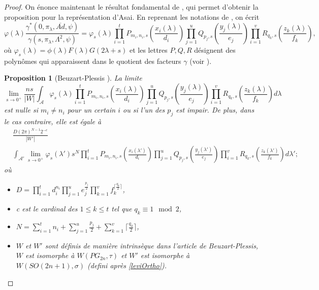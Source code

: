 \documentclass{amsart}
\newtheorem{proposition}{Proposition}[section]
\begin{document}
\begin{proof}
On énonce maintenant le résultat fondamental de \cite{beuzart-plessis}, qui permet d'obtenir la proposition pour la représentation d'Asai. En reprenant les notations de \cite{beuzart-plessis}, on écrit
\begin{equation}
\varphi(\lambda) \frac{\gamma^*(0, \pi_\lambda, \overline{Ad}, \psi)}{\gamma(s, \pi_\lambda, \Lambda^2, \psi)} = \varphi_s(\lambda) 
\prod_{i=1}^t P_{m_i,n_i,s}(\frac{x_i(\lambda)}{d_i}) \prod_{j=1}^u Q_{p_j,s}(\frac{y_j(\lambda)}{e_j}) \prod_{i=1}^v R_{q_k,s}(\frac{z_k(\lambda)}{f_k}),
\end{equation}
où $\varphi_s(\lambda) = \phi(\lambda) F(\lambda) G(2\lambda+s)$ et les lettres $P, Q, R$ désignent des polynômes qui apparaissent dans le quotient des facteurs $\gamma$ (voir \cite[section 3]{beuzart-plessis}).
\begin{proposition}[Beuzart-Plessis \cite{beuzart-plessis}]
\label{beuzart-plessis}
La limite
\begin{equation}
\lim_{s \rightarrow 0^+}  \frac{n s}{|W|} \int_{\mathcal{A}} \varphi_s(\lambda) 
\prod_{i=1}^t P_{m_i,n_i,s}(\frac{x_i(\lambda)}{d_i}) \prod_{j=1}^u Q_{p_j,s}(\frac{y_j(\lambda)}{e_j}) \prod_{i=1}^v R_{q_k,s}(\frac{z_k(\lambda)}{f_k}) d\lambda
\end{equation}
est nulle si $m_i \neq n_i$ pour un certain $i$ ou si l'un des $p_j$ est impair. De plus, dans le cas contraire, elle est égale à
\begin{equation}
\begin{split}
&\frac{D(2\pi)^{N-1}2^{-c}}{|W'|} \\
&\int_{\mathcal{A}'} \lim_{s \rightarrow 0^+} \varphi_s(\lambda') s^N \prod_{i=1}^t P_{m_i,n_i,s}(\frac{x_i(\lambda')}{d_i}) \prod_{j=1}^u Q_{p_j,s}(\frac{y_j(\lambda')}{e_j}) \prod_{i=1}^v R_{q_k,s}(\frac{z_k(\lambda')}{f_k}) d\lambda';
\end{split}
\end{equation}
où
\begin{itemize}
\item $D = \prod_{i=1}^t d_i^{n_i} \prod_{j=1}^u e_j^{\frac{p_j}{2}} \prod_{k=1}^v f_k^{\lceil \frac{q_k}{2} \rceil}$,
\item c est le cardinal des $1 \leq k \leq t$ tel que $q_k \equiv 1 \mod 2$,
\item $N = \sum_{i=1}^t n_i + \sum_{j=1}^u \frac{p_j}{2} + \sum_{k=1}^v \lceil \frac{q_k}{2} \rceil$,
\item $W$ et $W'$ sont définis de manière intrinsèque dans l'article de Beuzart-Plessis, $W$ est isomorphe à $W(PG_{2n}, \tau)$ et $W'$ est isomorphe à $W(SO(2n+1), \sigma)$ (defini après \ref{leviOrtho}).
\end{itemize}


\end{proposition}
\end{proof}
\end{document}
